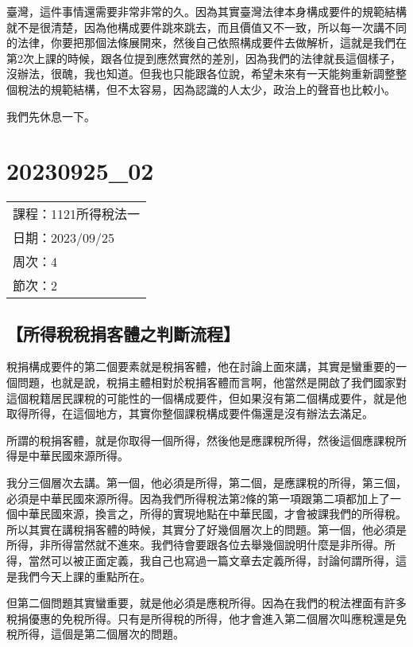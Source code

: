 \documentclass[]{ctexbook}
\begin{document}
臺灣，這件事情還需要非常非常的久。因為其實臺灣法律本身構成要件的規範結構就不是很清楚，因為他構成要件跳來跳去，而且價值又不一致，所以每一次講不同的法律，你要把那個法條展開來，然後自己依照構成要件去做解析，這就是我們在第2次上課的時候，跟各位提到應然實然的差別，因為我們的法律就長這個樣子，沒辦法，很醜，我也知道。但我也只能跟各位說，希望未來有一天能夠重新調整整個稅法的規範結構，但不太容易，因為認識的人太少，政治上的聲音也比較小。

我們先休息一下。

\hypertarget{section-8}{%
\chapter{20230925\_02}\label{section-8}}

\begin{longtable}[]{@{}l@{}}
\toprule()
\endhead
課程：1121所得稅法一 \\
日期：2023/09/25 \\
周次：4 \\
節次：2 \\
\bottomrule()
\end{longtable}

\hypertarget{ux6240ux5f97ux7a05ux7a05ux6350ux5ba2ux9ad4ux4e4bux5224ux65b7ux6d41ux7a0b}{%
\section{【所得稅稅捐客體之判斷流程】}\label{ux6240ux5f97ux7a05ux7a05ux6350ux5ba2ux9ad4ux4e4bux5224ux65b7ux6d41ux7a0b}}

稅捐構成要件的第二個要素就是稅捐客體，他在討論上面來講，其實是蠻重要的一個問題，也就是說，稅捐主體相對於稅捐客體而言啊，他當然是開啟了我們國家對這個稅籍居民課稅的可能性的一個構成要件，但如果沒有第二個構成要件，就是他取得所得，在這個地方，其實你整個課稅構成要件傷還是沒有辦法去滿足。

所謂的稅捐客體，就是你取得一個所得，然後他是應課稅所得，然後這個應課稅所得是中華民國來源所得。

我分三個層次去講。第一個，他必須是所得，第二個，是應課稅的所得，第三個，必須是中華民國來源所得。因為我們所得稅法第2條的第一項跟第二項都加上了一個中華民國來源，換言之，所得的實現地點在中華民國，才會被課我們的所得稅。所以其實在講稅捐客體的時候，其實分了好幾個層次上的問題。第一個，他必須是所得，非所得當然就不進來。我們待會要跟各位去舉幾個說明什麼是非所得。所得，當然可以被正面定義，我自己也寫過一篇文章去定義所得，討論何謂所得，這是我們今天上課的重點所在。

但第二個問題其實蠻重要，就是他必須是應稅所得。因為在我們的稅法裡面有許多稅捐優惠的免稅所得。只有是所得稅的所得，他才會進入第二個層次叫應稅還是免稅所得，這個是第二個層次的問題。
\end{document}
